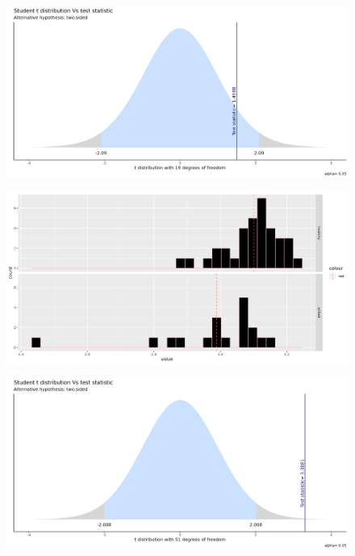 \begin{figure}[!]
\centering
\includegraphics[width=\textwidth]{Img/cap2/pruebat_varianzasdiferentes_Shannon.png}
\caption{}
\end{figure}


\begin{figure}[!]
\centering
\includegraphics[width=\textwidth]{Img/cap2/mediasFusarium_Shannon.png}
\caption{}
\end{figure}

\begin{figure}[!]
\centering
\includegraphics[width=\textwidth]{Img/cap2/pruebat_varianzasigualesFusarium_Shannon.png}
\caption{}
\end{figure}

